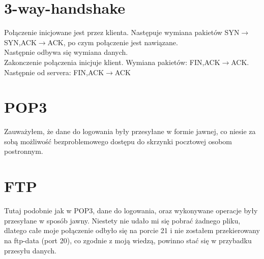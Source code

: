 \documentclass[a4paper,12pt]{article}
\begin{document}
\section{3-way-handshake}
Połączenie inicjowane jest przez klienta. Następuje wymiana pakietów SYN$\rightarrow$SYN,ACK$\rightarrow$ACK, po czym połączenie jest nawiązane.\\
Następnie odbywa się wymiana danych.\\
Zakonczenie połączenia inicjuje klient. Wymiana pakietów: FIN,ACK$\rightarrow$ACK. Następnie od servera: FIN,ACK$\rightarrow$ACK
\section{POP3}
Zauważyłem, że dane do logowania były przesyłane w formie jawnej, co niesie za sobą możliwość bezproblemowego dostępu do skrzynki pocztowej osobom postronnym.
\section{FTP}
Tutaj podobnie jak w POP3, dane do logowania, oraz wykonywane operacje były przesyłane w sposób jawny.
Niestety nie udało mi się pobrać żadnego pliku, dlatego całe moje połączenie odbyło się na porcie 21 i nie zostałem przekierowany na ftp-data (port 20), co zgodnie z moją wiedzą, powinno stać się w przybadku przesyłu danych.
\end{document}
